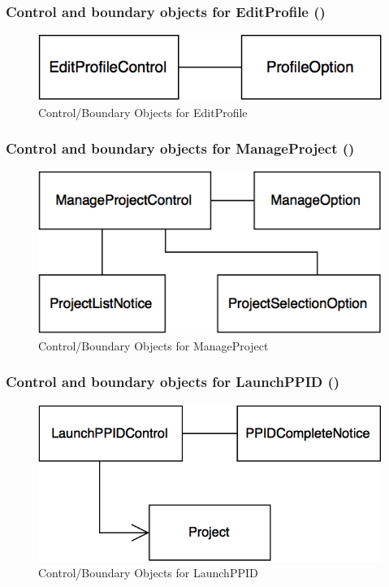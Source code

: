 \documentclass[12pt,letterpaper]{article}
\begin{document}
\subsubsection*{Control and boundary objects for EditProfile (\editprofile{})}

\begin{figure}[H]
	\centering{}
	\includegraphics[scale=0.4]{imgs/cbod/edit-profile.png}
	\caption{Control/Boundary Objects for EditProfile}
\end{figure}

\subsubsection*{Control and boundary objects for ManageProject (\manageproject{})}

\begin{figure}[H]
	\centering{}
	\includegraphics[scale=0.4]{imgs/cbod/manage-project.png}
	\caption{Control/Boundary Objects for ManageProject}
\end{figure}

\subsubsection*{Control and boundary objects for LaunchPPID (\launchppid{})}

\begin{figure}[H]
	\centering{}
	\includegraphics[scale=0.4]{imgs/cbod/launch-ppid.png}
	\caption{Control/Boundary Objects for LaunchPPID}
\end{figure}
\end{document}
